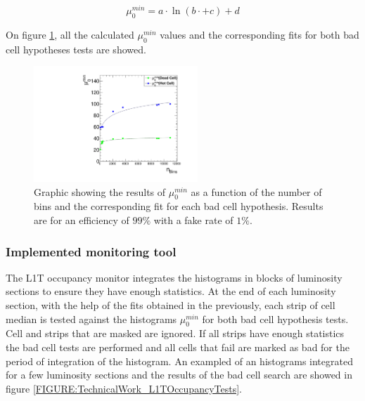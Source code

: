 \begin{equation}
\mu_{0}^{min}= a \cdot \ln(b \cdot + c) + d
\label{EQUATION:TechnicalWork_Occupancy_MuMinFits}
\end{equation}

On figure \ref{FIGURE:TechnicalWork_L1TOccupancyMuMin}, all the calculated $\mu_0^{min}$ values and the corresponding fits for both bad cell hypotheses tests are showed.

\begin{figure}[!htb]
\centering
\includegraphics[width=0.55\textwidth]{Chapter03/L1TOnline/Images/L1TOccupancy_MuMin.pdf}
\caption{Graphic showing the results of $\mu_0^{min}$ as a function of the number of bins and the corresponding fit for each bad cell hypothesis. Results are for an efficiency of $99\%$ with a fake rate of $1\%$.}
\label{FIGURE:TechnicalWork_L1TOccupancyMuMin}
\end{figure}

\subsubsection{Implemented monitoring tool}


The \gls{L1T} occupancy monitor integrates the histograms in blocks of luminosity sections to ensure they have enough statistics. At the end of each luminosity section, with the help of the fits obtained in the previously, each strip of cell median is tested against the histograms $\mu_0^{min}$ for both bad cell hypothesis tests. Cell and strips that are masked are ignored. If all strips have enough statistics the bad cell tests are performed and all cells that fail are marked as bad for the period of integration of the histogram. An exampled of an histograms integrated for a few luminosity sections and the results of the bad cell search are showed in figure \ref{FIGURE:TechnicalWork_L1TOccupancyTests}. 

